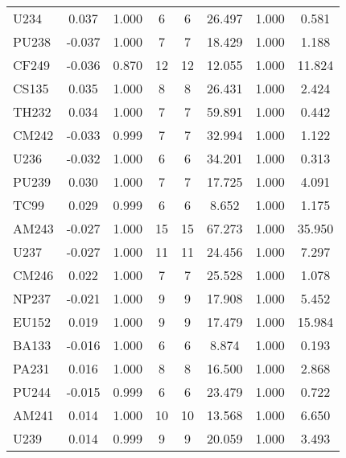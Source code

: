\begin{tabular}{|l|ccccccc|}
U234 & 0.037 & 1.000 & 6 & 6 & 26.497 & 1.000 & 0.581\\
PU238 & -0.037 & 1.000 & 7 & 7 & 18.429 & 1.000 & 1.188\\
CF249 & -0.036 & 0.870 & 12 & 12 & 12.055 & 1.000 & 11.824\\
CS135 & 0.035 & 1.000 & 8 & 8 & 26.431 & 1.000 & 2.424\\
TH232 & 0.034 & 1.000 & 7 & 7 & 59.891 & 1.000 & 0.442\\
CM242 & -0.033 & 0.999 & 7 & 7 & 32.994 & 1.000 & 1.122\\
U236 & -0.032 & 1.000 & 6 & 6 & 34.201 & 1.000 & 0.313\\
PU239 & 0.030 & 1.000 & 7 & 7 & 17.725 & 1.000 & 4.091\\
TC99 & 0.029 & 0.999 & 6 & 6 & 8.652 & 1.000 & 1.175\\
AM243 & -0.027 & 1.000 & 15 & 15 & 67.273 & 1.000 & 35.950\\
U237 & -0.027 & 1.000 & 11 & 11 & 24.456 & 1.000 & 7.297\\
CM246 & 0.022 & 1.000 & 7 & 7 & 25.528 & 1.000 & 1.078\\
NP237 & -0.021 & 1.000 & 9 & 9 & 17.908 & 1.000 & 5.452\\
EU152 & 0.019 & 1.000 & 9 & 9 & 17.479 & 1.000 & 15.984\\
BA133 & -0.016 & 1.000 & 6 & 6 & 8.874 & 1.000 & 0.193\\
PA231 & 0.016 & 1.000 & 8 & 8 & 16.500 & 1.000 & 2.868\\
PU244 & -0.015 & 0.999 & 6 & 6 & 23.479 & 1.000 & 0.722\\
AM241 & 0.014 & 1.000 & 10 & 10 & 13.568 & 1.000 & 6.650\\
U239 & 0.014 & 0.999 & 9 & 9 & 20.059 & 1.000 & 3.493\\
\hline
\end{tabular}